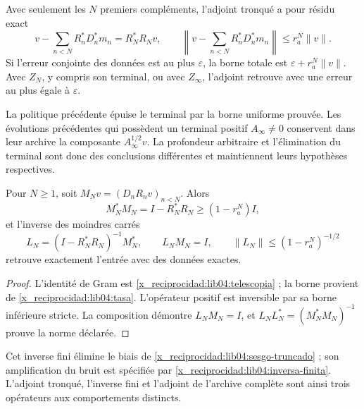 Avec seulement les \(N\) premiers compléments, l’adjoint tronqué a pour
résidu exact
\begin{equation}
 v-\sum_{n<N}R_n^*D_n^*m_n=R_N^*R_Nv,
 \qquad
 \left\|v-\sum_{n<N}R_n^*D_n^*m_n\right\|
 \leq r_a^N\|v\|.
 \label{x_reciprocidad:lib04:sesgo-truncado}
\end{equation}
Si l’erreur conjointe des données est au plus \(\varepsilon\), la
borne totale est \(\varepsilon+r_a^N\|v\|\). Avec \(Z_N\), y compris
son terminal, ou avec \(Z_\infty\), l’adjoint retrouve avec une erreur au
plus égale à \(\varepsilon\).

La politique précédente épuise le terminal par la borne uniforme prouvée.
Les évolutions précédentes qui possèdent un terminal positif
\(A_\infty\neq0\) conservent dans leur archive la composante
\(A_\infty^{1/2}v\). La profondeur arbitraire et l’élimination du
terminal sont donc des conclusions différentes et maintiennent leurs
hypothèses respectives.

\begin{proposition}
\label{x_reciprocidad:lib04:prop-inversa-finita}
Pour \(N\geq1\), soit \(M_Nv=(D_nR_nv)_{n<N}\). Alors
\begin{equation}
 M_N^*M_N=I-R_N^*R_N\geq(1-r_a^N)I,
 \label{x_reciprocidad:lib04:gram-finito}
\end{equation}
et l’inverse des moindres carrés
\begin{equation}
 L_N=(I-R_N^*R_N)^{-1}M_N^*,\qquad
 L_NM_N=I,\qquad
 \|L_N\|\leq(1-r_a^N)^{-1/2}
 \label{x_reciprocidad:lib04:inversa-finita}
\end{equation}
retrouve exactement l’entrée avec des données exactes.
\end{proposition}

\begin{proof}
L’identité de Gram est \eqref{x_reciprocidad:lib04:telescopia} ; la borne provient de
\eqref{x_reciprocidad:lib04:tasa}. L’opérateur positif est inversible par sa borne
inférieure stricte. La composition démontre \(L_NM_N=I\), et
\(L_NL_N^*=(M_N^*M_N)^{-1}\) prouve la norme déclarée.
\end{proof}

Cet inverse fini élimine le biais de
\eqref{x_reciprocidad:lib04:sesgo-truncado} ; son amplification du bruit est
spécifiée par \eqref{x_reciprocidad:lib04:inversa-finita}. L’adjoint tronqué,
l’inverse fini et l’adjoint de l’archive complète sont ainsi trois
opérateurs aux comportements distincts.

